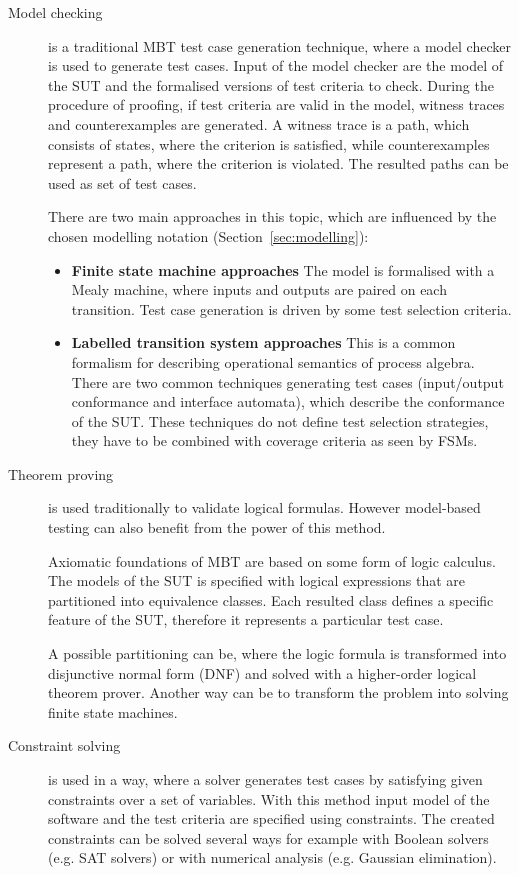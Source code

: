 \begin{description}
	\item[Model checking] is a traditional MBT test case generation technique, where a model checker is used to generate test cases. Input of the model checker are the model of the SUT and the formalised versions of test criteria to check. During the procedure of proofing, if test criteria are valid in the model, witness traces and counterexamples are generated. A witness trace is a path, which consists of states, where the criterion is satisfied, while counterexamples represent a path, where the criterion is violated. The resulted paths can be used as set of test cases.

There are two main approaches in this topic, which are influenced by the chosen modelling notation (Section~\ref{sec:modelling}):

\begin{itemize}
	\item \textbf{Finite state machine approaches} The model is formalised with a Mealy machine, where inputs and outputs are paired on each transition. Test case generation is driven by some test selection criteria.
	\item \textbf{Labelled transition system approaches} This is a common formalism for describing operational semantics of process algebra. There are two common techniques generating test cases (input/output conformance and interface automata), which describe the conformance of the SUT. These techniques do not define test selection strategies, they have to be combined with coverage criteria as seen by FSMs.
\end{itemize}

	\item[Theorem proving] is used traditionally to validate logical formulas. However model-based testing can also benefit from the power of this method.
	
	Axiomatic foundations of MBT are based on some form of logic calculus. The models of the SUT is specified with logical expressions that are partitioned into equivalence classes. Each resulted class defines a specific feature of the SUT, therefore it represents a particular test case.
	
	A possible partitioning can be, where the logic formula is transformed into disjunctive normal form (DNF) and solved with a higher-order logical theorem prover. Another way can be to transform the problem into solving finite state machines.

	\item[Constraint solving] is used in a way, where a solver generates test cases by satisfying given constraints over a set of variables. With this method input model of the software and the test criteria are specified using constraints. The created constraints can be solved several ways for example with Boolean solvers (e.g. SAT solvers) or with numerical analysis (e.g. Gaussian elimination).

\end{description}

